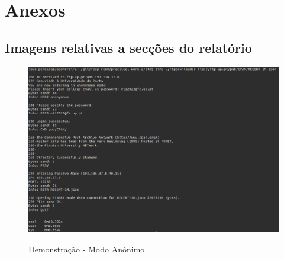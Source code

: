 \documentclass[a4paper]{article}
\begin{document}
\newpage
\appendix
\section{Anexos}
\subsection{Imagens relativas a secções do relatório}

\begin{figure}[h!]
\centering
\caption{Demonstração - Modo Anónimo}
\includegraphics[scale=0.3]{res/teste-anonymous.png}
\label{fig:anonymous}
\end{figure}
\end{document}
